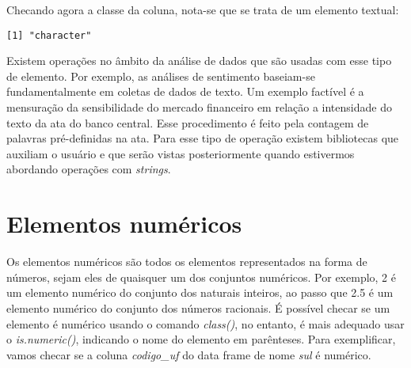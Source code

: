 \documentclass[
  letterpaper,
  DIV=11,
  numbers=noendperiod]{scrreprt}
\newenvironment{Shaded}{\begin{snugshade}}{\end{snugshade}}
\newcommand{\FunctionTok}[1]{\textcolor[rgb]{0.28,0.35,0.67}{#1}}
\newcommand{\NormalTok}[1]{\textcolor[rgb]{0.00,0.23,0.31}{#1}}
\newcommand{\OtherTok}[1]{\textcolor[rgb]{0.00,0.23,0.31}{#1}}
\newcommand{\SpecialCharTok}[1]{\textcolor[rgb]{0.37,0.37,0.37}{#1}}
\begin{document}
\begin{Shaded}
\end{Shaded}

Checando agora a classe da coluna, nota-se que se trata de um elemento
textual:

\begin{Shaded}
\end{Shaded}

\begin{verbatim}
[1] "character"
\end{verbatim}

Existem operações no âmbito da análise de dados que são usadas com esse
tipo de elemento. Por exemplo, as análises de sentimento baseiam-se
fundamentalmente em coletas de dados de texto. Um exemplo factível é a
mensuração da sensibilidade do mercado financeiro em relação a
intensidade do texto da ata do banco central. Esse procedimento é feito
pela contagem de palavras pré-definidas na ata. Para esse tipo de
operação existem bibliotecas que auxiliam o usuário e que serão vistas
posteriormente quando estivermos abordando operações com \emph{strings}.

\section{Elementos numéricos}\label{elementos-numuxe9ricos}

Os elementos numéricos são todos os elementos representados na forma de
números, sejam eles de quaisquer um dos conjuntos numéricos. Por
exemplo, 2 é um elemento numérico do conjunto dos naturais inteiros, ao
passo que 2.5 é um elemento numérico do conjunto dos números racionais.
É possível checar se um elemento é numérico usando o comando
\emph{class()}, no entanto, é mais adequado usar o \emph{is.numeric()},
indicando o nome do elemento em parênteses. Para exemplificar, vamos
checar se a coluna \emph{codigo\_uf} do data frame de nome \emph{sul} é
numérico.

\begin{Shaded}
\end{Shaded}
\end{document}
